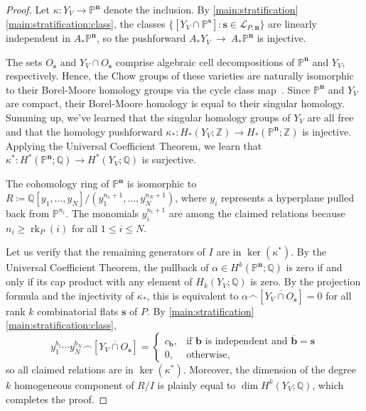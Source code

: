 \documentclass[11pt]{article}
\theoremstyle{definition}
\numberwithin{equation}{section}
\renewcommand{\P}{\mathbb{P}}
\newcommand{\Q}{\mathbb{Q}}
\newcommand{\Z}{{\mathbb{Z}}}
\DeclareMathOperator{\rk}{rk}
\newcommand{\revision}[1]{{#1}}
\begin{document}
\begin{proof}
  Let $\kappa: Y_V \to \P^{\mathbf n}$ denote the inclusion.
  \revision{By \cref{main:stratification}\cref{main:stratification:class}, the classes \mbox{$\{[Y_V \cap \P^{\mathbf s}] : \mathbf s \in \mathcal L_{P,\mathbf n}\}$} are linearly independent in $A_* \P^{\mathbf n}$, so the pushforward $A_*Y_V~\to~A_* \P^{\mathbf n}$ is injective.}

  The sets $O_{\mathbf s}$ and $Y_V \cap O_{\mathbf s}$ comprise \revision{algebraic} cell decompositions of $\P^{\mathbf n}$ and $Y_V$, respectively.
  Hence, the Chow groups of these varieties are naturally isomorphic to their Borel-Moore homology groups via the cycle class map~\cite[Example 19.1.11]{F98}.
  Since $\P^{\mathbf n}$ and $Y_V$ are compact, their Borel-Moore homology is equal to their singular homology.
  Summing up, we've learned that the singular homology groups of $Y_V$ are all free and that the homology pushforward $\kappa_*: H_*(Y_V; \Z) \to H_*(\P^{\mathbf n}; \Z)$ is injective.
  Applying the Universal Coefficient Theorem, we learn that $\kappa^*: H^*(\P^{\mathbf n}; \Q) \to H^*(Y_V; \Q)$ is surjective.
  
  The cohomology ring of $\P^{\mathbf n}$ is isomorphic to $R \coloneqq \Q[y_1, \ldots, y_N] / (y_1^{n_1+1}, \ldots, y_N^{n_N+1})$, where $y_i$ represents a hyperplane pulled back from $\P^{n_i}$. The monomials $y_i^{n_i+1}$ are among the claimed relations because $n_i \geq \rk_P(i)$ for all $1 \leq i \leq N$.

  Let us verify that the remaining generators of $I$ are in $\ker(\kappa^*)$. By the Universal Coefficient Theorem, the pullback of $\alpha \in H^k(\P^{\mathbf n}; \Q)$ is zero if and only if its cap product with any element of $H_k(Y_V; \Q)$ is zero.
  By the projection formula and the injectivity of $\kappa_*$, this is equivalent to $\alpha \smallfrown [\overline{Y_V \cap O_{\mathbf s}}] = 0$ for all rank $k$ combinatorial flats $\mathbf s$ of $P$.
  By \cref{main:stratification}\cref{main:stratification:class},
  \[ y_1^{b_1} \cdots y_N^{b_N} \smallfrown [\overline{Y_V \cap O_{\mathbf s}}] =
    \begin{cases}
        c_{\mathbf b}, & \text{if $\mathbf b$ is independent and $\overline{\mathbf b} =\mathbf s$} \\
      0, &\text{otherwise,}
    \end{cases} \]
  so all claimed relations are in $\ker(\kappa^*)$.
  Moreover, the dimension of the degree $k$ homogeneous component of $R/I$ is plainly equal to $\dim H^k(Y_V; \Q)$, which completes the proof.
\end{proof}
\end{document}
